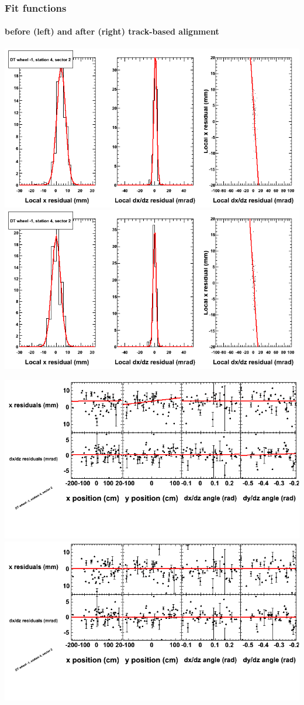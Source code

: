 \documentclass[compress]{beamer}
\begin{document}
\begin{frame}
\frametitle{Fit functions}
\framesubtitle{before (left) and after (right) track-based alignment}
\includegraphics[width=0.5\linewidth]{fitfunctions_re01/MBwhBst4sec02_bellcurves.png} \includegraphics[width=0.5\linewidth]{fitfunctions_re05/MBwhBst4sec02_bellcurves.png}

\includegraphics[width=0.5\linewidth]{fitfunctions_re01/MBwhBst4sec02_polynomials.png} \includegraphics[width=0.5\linewidth]{fitfunctions_re05/MBwhBst4sec02_polynomials.png}
\end{frame}
\end{document}
